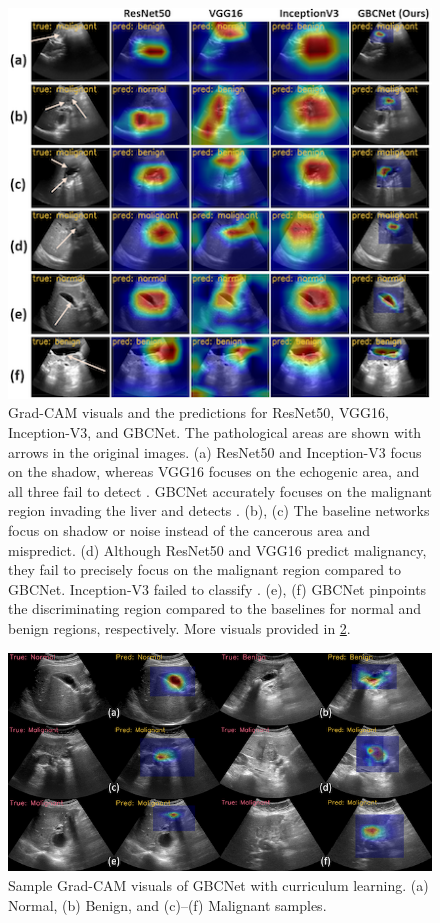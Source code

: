 
%
\begin{figure}[t]
	\centering
	\includegraphics[width=0.62\linewidth]{figs/gbcnet/grad-cam.png}
	\caption[Qaualitative analysis of GBCNet with Grad-CAM visuals]{Grad-CAM visuals and the predictions for ResNet50, VGG16, Inception-V3, and GBCNet. The pathological areas are shown with arrows in the original images. 
	(a) ResNet50 and Inception-V3 focus on the shadow, whereas VGG16 focuses on the echogenic area, and all three fail to detect \gbc. GBCNet accurately focuses on the malignant \gb region invading the liver and detects \gbc.  (b), (c) The baseline networks focus on shadow or noise instead of the cancerous area and mispredict. 
	(d) Although ResNet50 and VGG16 predict malignancy, they fail to precisely focus on the malignant region compared to GBCNet. Inception-V3 failed to classify \gbc. (e), (f) GBCNet pinpoints the discriminating region compared to the baselines for normal and benign \gb regions, respectively. More visuals provided in \cref{fig:supple-2}.} %
	\label{fig:gbc_vis}
\end{figure}

\begin{figure}[t]
	\centering
	\includegraphics[width=0.7\linewidth]{figs/gbcnet/vis-s-1.png}
	\caption[Additional Grad-CAM visuals for GBCNet]{Sample Grad-CAM visuals of GBCNet with curriculum learning. (a) Normal, (b) Benign, and (c)--(f) Malignant samples.}
	\label{fig:supple-2}
\end{figure}

